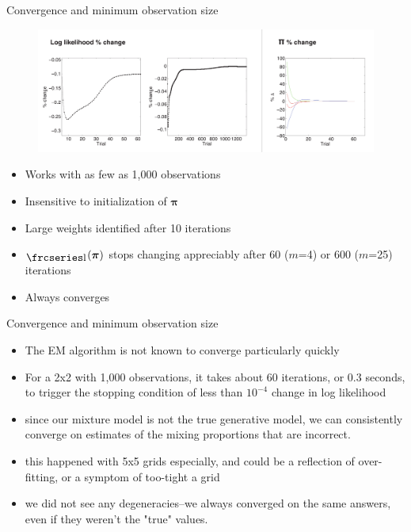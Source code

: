 \documentclass{beamer}
\newcommand{\textfrc}[1]{{\frcseries#1}}
\newcommand{\mathfrc}[1]{\raisebox{-0.8mm}{\text{\textfrc{\small #1}}}\hspace{0.4mm}}
\newcommand{\vect}[1]{\boldsymbol{\mathbf{#1}}}
\newcommand{\llp}{\mathfrc{l}(\vect{\pi})}
\begin{document}
\begin{frame}{Convergence and minimum observation size}
	
	\begin{figure}
			\begin{center}
				\includegraphics[width=\textwidth]{diag_simple.pdf}
			\end{center}
	\end{figure}
	
	\begin{itemize}
		\item Works with as few as 1,000 observations
		\item Insensitive to initialization of $\vect{\pi}$
		\item Large weights identified after 10 iterations
		\item $\llp$ stops changing appreciably after 60 ($m$=4) or 600 ($m$=25) iterations
		\item Always converges
	\end{itemize}

	
\end{frame}
\begin{frame}[shrink]{Convergence and minimum observation size}
		
	
	\begin{itemize}
		\item The EM algorithm is not known to converge particularly quickly
		\item For a 2x2 with 1,000 observations, it takes about 60 iterations, or 0.3 seconds, to trigger the stopping condition of less than $10^{-4}$ change in log likelihood
		
		\item since our mixture model is not the true generative model, we can consistently converge on estimates of the mixing proportions that are incorrect.
		\item this happened with 5x5 grids especially, and could be a reflection of over-fitting, or a symptom of too-tight a grid
		\item we did not see any degeneracies--we always converged on the same answers, even if they weren't the "true" values.
		
	\end{itemize}
	
\end{frame}
\end{document}
